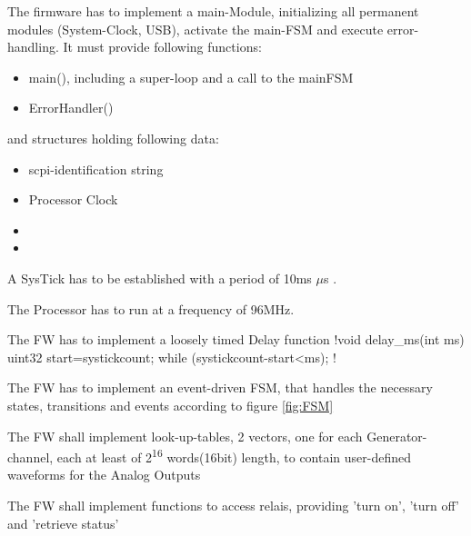 

	{	The firmware has to implement a main-Module, initializing all permanent modules (System-Clock, USB), activate the main-FSM and execute error-handling. It must provide following functions:
		\begin{itemize} \setlength\itemsep{1px}
		\item main(), including a super-loop and a call to the mainFSM
		\item ErrorHandler()
		\end{itemize}
		
		and structures holding following data:
		\begin{itemize} \setlength\itemsep{1px}
		\item scpi-identification string
		\item Processor Clock
		\item 
		\item 
		\end{itemize}

	}




	{	A SysTick has to be established with a period of 10ms $\mu$s .
	}

	{	The Processor has to run at a frequency of 96MHz.
	}

	{	The FW has to implement a loosely timed Delay function 
		\lstC !void delay_ms(int ms){     uint32 start=systickcount;    while (systickcount-start<ms); }!
	}

	{ The FW has to implement an event-driven FSM, that handles the necessary states, transitions and events according to figure \ref{fig:FSM} }

	{ The FW shall implement look-up-tables, 2 vectors, one for each Generator-channel, each at least of 2\textsuperscript{16} words(16bit) length, to contain user-defined waveforms for the Analog Outputs }

	{ The FW shall implement functions to access relais, providing 'turn on', 'turn off' and 'retrieve status' }


